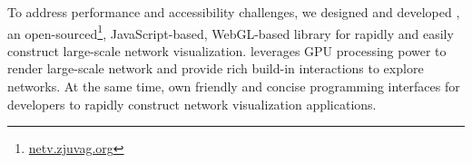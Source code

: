 To address performance and accessibility challenges, we designed and developed \name, an open-sourced\footnote{\url{netv.zjuvag.org}}, JavaScript-based, WebGL-based library for rapidly and easily construct large-scale network visualization.
\name leverages GPU processing power to render large-scale network and provide rich build-in interactions to explore networks.
At the same time, \name own friendly and concise programming interfaces for developers to rapidly construct network visualization applications.




